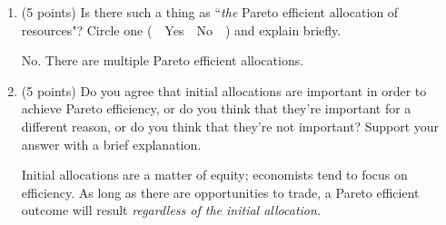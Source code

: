 \documentclass[twoside]{article}
\begin{document}
\begin{enumerate}
\begin{enumerate}
        \begin{enumerate}

        \item \begin{EXAM} (5 points) Is there such a thing as ``\emph{the} Pareto efficient allocation of resources"? Circle one (\ \ Yes\ \ No\ \ ) and explain briefly. \vspace*{2in}\end{EXAM}

\begin{KEY}
No. There are multiple Pareto efficient allocations.
\end{KEY}


        \item \begin{EXAM} (5 points) Do you agree that initial allocations are important in order to achieve Pareto efficiency, or do you think that they're important for a different reason, or do you think that they're not important?  Support your answer with a brief explanation. \clearpage\end{EXAM}

\begin{KEY}
Initial allocations are a matter of equity; economists tend to focus on efficiency. As long as there are opportunities to trade, a Pareto efficient outcome will result \emph{regardless of the initial allocation.}
\end{KEY}

        \end{enumerate}

    \end{enumerate}












\begin{comment}
\item (Overinvestment as a barrier to entry) Consider the following sequential move games of complete information. The games are between an incumbent monopolist (M) and a potential entrant (PE). You can answer these questions without looking at the stories, but the stories do provide some context and motivation.

Story \#1 (See figure~\ref{overinvestment1}): Firm M is an incumbent monopolist. Firm PE is considering spending \$30 to build a factory and enter the market. If firm PE stays out, firm M gets the whole market. If firm PE enters the market, firm M can either build another factory and engage in a price war or peacefully share the market with firm PE.


\end{comment}
\end{enumerate}
\end{document}
